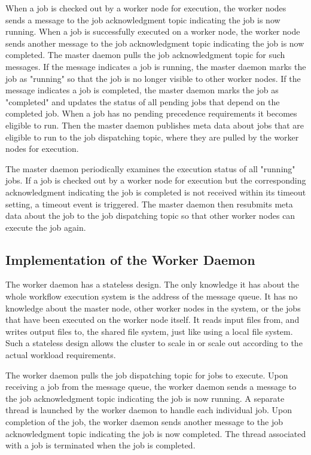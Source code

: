 When a job is checked out by a worker node for execution, the worker nodes sends a message to the job acknowledgment topic indicating the job is now running. When a job is successfully executed on a worker node, the worker node sends another message to the job acknowledgment topic indicating the job is now completed. The master daemon pulls the job acknowledgment topic for such messages. If the message indicates a job is running, the master daemon marks the job as "running" so that the job is no longer visible to other worker nodes. If the message indicates a job is completed, the master daemon marks the job as "completed" and updates the status of all pending jobs that depend on the completed job. When a job has no pending precedence requirements it becomes eligible to run. Then the master daemon publishes meta data about jobs that are eligible to run to the job dispatching topic, where they are pulled by the worker nodes for execution.

The master daemon periodically examines the execution status of all "running" jobs. If a job is checked out by a worker node for execution but the corresponding acknowledgment indicating the job is completed is not received within its timeout setting, a timeout event is triggered. The master daemon then resubmits meta data about the job to the job dispatching topic so that other worker nodes can execute the job again.


\subsection{Implementation of the Worker Daemon}
\label{sec:subsec:worker_daemon}

The worker daemon has a stateless design. The only knowledge it has about the whole workflow execution system is the address of the message queue. It has no knowledge about the master node, other worker nodes in the system, or the jobs that have been executed on the worker node itself. It reads input files from, and writes output files to, the shared file system, just like using a local file system. Such a stateless design allows the cluster to scale in or scale out according to the actual workload requirements. 

The worker daemon pulls the job dispatching topic for jobs to execute. Upon receiving a job from the message queue, the worker daemon sends a message to the job acknowledgment topic indicating the job is now running. A separate thread is launched by the worker daemon to handle each individual job. Upon completion of the job, the worker daemon sends another message to the job acknowledgment topic indicating the job is now completed. The thread associated with a job is terminated when the job is completed. 


